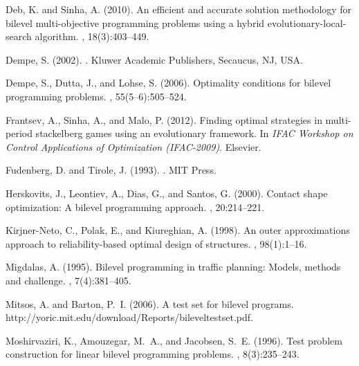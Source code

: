 \documentclass[twoside]{article}
\begin{document}
\begin{thebibliography}{}
Deb, K. and Sinha, A. (2010).
\newblock An efficient and accurate solution methodology for bilevel
  multi-objective programming problems using a hybrid evolutionary-local-search
  algorithm.
, 18(3):403--449.

Dempe, S. (2002).
.
\newblock Kluwer Academic Publishers, Secaucus, NJ, USA.

Dempe, S., Dutta, J., and Lohse, S. (2006).
\newblock Optimality conditions for bilevel programming problems.
, 55(5--6):505--524.

Frantsev, A., Sinha, A., and Malo, P. (2012).
\newblock Finding optimal strategies in multi-period stackelberg games using an
  evolutionary framework.
\newblock In {\em IFAC Workshop on Control Applications of Optimization
  (IFAC-2009)}. Elsevier.

Fudenberg, D. and Tirole, J. (1993).
.
\newblock MIT Press.

Herskovits, J., Leontiev, A., Dias, G., and Santos, G. (2000).
\newblock Contact shape optimization: A bilevel programming approach.
, 20:214--221.

Kirjner-Neto, C., Polak, E., and Kiureghian, A. (1998).
\newblock An outer approximations approach to reliability-based optimal design
  of structures.
, 98(1):1--16.

Migdalas, A. (1995).
\newblock Bilevel programming in traffic planning: Models, methods and
  challenge.
, 7(4):381--405.

Mitsos, A. and Barton, P.~I. (2006).
\newblock A test set for bilevel programs.
\newblock http://yoric.mit.edu/download/Reports/bileveltestset.pdf.

Moshirvaziri, K., Amouzegar, M.~A., and Jacobsen, S.~E. (1996).
\newblock Test problem construction for linear bilevel programming problems.
, 8(3):235--243.


\end{thebibliography}
\end{document}
